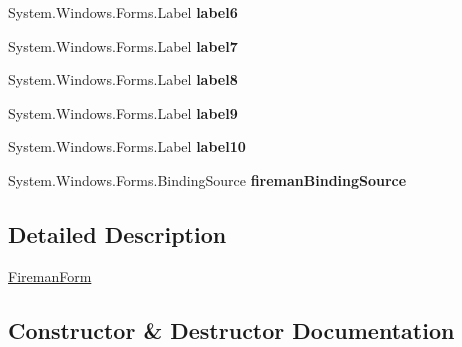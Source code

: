 \begin{DoxyCompactItemize}
\item 
\mbox{\label{class_statystyki___o_s_p_1_1_fireman_form_af5d753d3be010120763ba16f61a84f9a}} 
System.\+Windows.\+Forms.\+Label {\bfseries label6}
\item 
\mbox{\label{class_statystyki___o_s_p_1_1_fireman_form_a138caa862bebd0f5a80dd59daa4bcc06}} 
System.\+Windows.\+Forms.\+Label {\bfseries label7}
\item 
\mbox{\label{class_statystyki___o_s_p_1_1_fireman_form_a3c9e8f84042fa636a16f4823ececea9b}} 
System.\+Windows.\+Forms.\+Label {\bfseries label8}
\item 
\mbox{\label{class_statystyki___o_s_p_1_1_fireman_form_a72ed7825d35e7993281749570235f043}} 
System.\+Windows.\+Forms.\+Label {\bfseries label9}
\item 
\mbox{\label{class_statystyki___o_s_p_1_1_fireman_form_a3f85e5e5f38c2789972f66ffba5d9b8f}} 
System.\+Windows.\+Forms.\+Label {\bfseries label10}
\item 
\mbox{\label{class_statystyki___o_s_p_1_1_fireman_form_aecf9207efaef9f09c65b821f90ce7829}} 
System.\+Windows.\+Forms.\+Binding\+Source {\bfseries fireman\+Binding\+Source}
\end{DoxyCompactItemize}


\subsection{Detailed Description}
\mbox{\hyperlink{class_statystyki___o_s_p_1_1_fireman_form}{Fireman\+Form}} 



\subsection{Constructor \& Destructor Documentation}
\mbox{\label{class_statystyki___o_s_p_1_1_fireman_form_a312f4597fb08b110a3bbc19f49c377c7}} 
